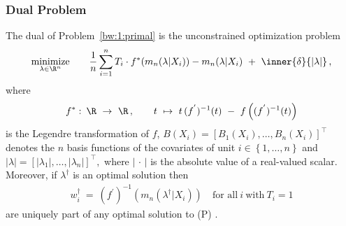 \subsubsection*{Dual Problem}
\begin{ftheorem}
  The dual of Problem~\ref{bw:1:primal} is the unconstrained optimization problem 
  \begin{gather*}
    \underset{\lambda \in \R^n}{\mathrm{minimize}}
    \qquad
    \frac{1}{n}
    \sum_{i = 1}^{n} 
    T_i 
    \cdot
    f^*
    (
      m_n(\lambda|X_i)
    )
    -
      m_n(\lambda|X_i)
    \ 
    +
    \ 
    \inner{\delta}{\left| \lambda \right|}
    \,,
  \end{gather*}
  where
  \begin{gather*}
  f^*
  \,
  \colon
  \, 
  \R
  \ 
  \to
  \ 
  \R
  \,
  ,
  \qquad 
  t 
  \ 
  \mapsto
  \ 
    t\,(f^{'})^{-1}(t)
  \ 
    -
  \ 
    f
    \left( 
      (f^{'})^{-1}(t)
    \right)
  \end{gather*}
  is the Legendre transformation of $f$,
  $
    B(X_i)
    =
    \left[ 
      B_1(X_i)
      ,
      \ldots
      ,
      B_n(X_i)
    \right]
    ^\top
  $
  denotes the $n$ basis functions of the covariates 
  of unit $i\in \left\{ 1, \ldots, n \right\}$
  and
  $
    \left| \lambda \right|
    =
    \left[ 
      \left| \lambda_1 \right|
      ,
      \ldots
      ,
      \left| \lambda_n \right|
    \right]
    ^\top
    ,
  $
  where $\left| \,\cdot\, \right|$
  is the absolute value of a real-valued scalar.
  Moreover, if $\lambda^\dagger$
  is an optimal solution then
  \begin{gather*}
    w_i^\dagger
    \ 
    =
    \ 
    (f^{'})^{-1}
    \left( 
      m_n
      (
      \lambda^\dagger
      |
      X_i
      )
    \right)
    \quad
    \text{for all}\ 
    i
    \ 
    \text{with}\ 
    T_i=1
  \end{gather*}
  are uniquely part of any optimal solution to (P)
  .
\end{ftheorem}
